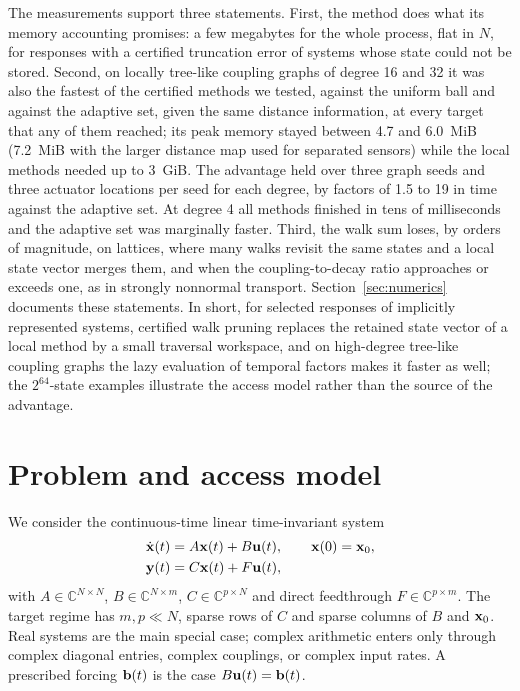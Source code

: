 \documentclass[aps,pra,superscriptaddress,floatfix,longbibliography,twocolumn]{revtex4-2}
\newcommand{\bx}{{\bf x}}
\newcommand{\bu}{{\bf u}}
\newcommand{\by}{{\bf y}}
\newcommand{\bb}{{\bf b}}
\begin{document}
The measurements support three statements. First, the method does what its memory accounting promises: a few megabytes for the whole process, flat in $N$, for responses with a certified truncation error of systems whose state could not be stored. Second, on locally tree-like coupling graphs of degree 16 and 32 it was also the fastest of the certified methods we tested, against the uniform ball and against the adaptive set, given the same distance information, at every target that any of them reached; its peak memory stayed between 4.7 and 6.0~MiB (7.2~MiB with the larger distance map used for separated sensors) while the local methods needed up to 3~GiB. The advantage held over three graph seeds and three actuator locations per seed for each degree, by factors of 1.5 to 19 in time against the adaptive set. At degree 4 all methods finished in tens of milliseconds and the adaptive set was marginally faster. Third, the walk sum loses, by orders of magnitude, on lattices, where many walks revisit the same states and a local state vector merges them, and when the coupling-to-decay ratio approaches or exceeds one, as in strongly nonnormal transport. Section~\ref{sec:numerics} documents these statements. In short, for selected responses of implicitly represented systems, certified walk pruning replaces the retained state vector of a local method by a small traversal workspace, and on high-degree tree-like coupling graphs the lazy evaluation of temporal factors makes it faster as well; the $2^{64}$-state examples illustrate the access model rather than the source of the advantage.
\section{Problem and access model}\label{sec:problem}

We consider the continuous-time linear time-invariant system
\begin{equation}\label{eq:lti}
\begin{aligned}
\dot\bx(t)&=A\bx(t)+B\bu(t),\qquad \bx(0)=\bx_0,\\
\by(t)&=C\bx(t)+F\bu(t),
\end{aligned}
\end{equation}
with $A\in\mathbb{C}^{N\times N}$, $B\in\mathbb{C}^{N\times m}$, $C\in\mathbb{C}^{p\times N}$ and direct feedthrough $F\in\mathbb{C}^{p\times m}$. The target regime has $m,p\ll N$, sparse rows of $C$ and sparse columns of $B$ and $\bx_0$. Real systems are the main special case; complex arithmetic enters only through complex diagonal entries, complex couplings, or complex input rates. A prescribed forcing $\bb(t)$ is the case $B\bu(t)=\bb(t)$.
\end{document}
